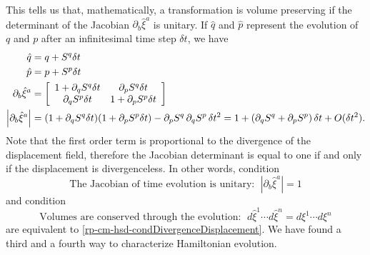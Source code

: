 This tells us that, mathematically, a transformation is volume preserving if the determinant of the Jacobian $\partial_b \hat{\xi}^a$ is unitary. If $\hat{q}$ and $\hat{p}$ represent the evolution of $q$ and $p$ after an infinitesimal time step $\delta t$, we have
\begin{equation}
	\begin{aligned}
	\hat{q} &= q + S^q \delta t \\ 
	\hat{p} &= p + S^p \delta t \\ 
	\partial_b \hat{\xi}^a &= \left[\begin{array}{ c c }
		1 + \partial_q S^q \delta t & \partial_p S^q \delta t \\
		\partial_q S^p \delta t & 1 + \partial_p S^p \delta t \\
	\end{array} \right] \\
	\left|\partial_b \hat{\xi}^a\right| &= (1 + \partial_q S^q \delta t) (1 + \partial_p S^p \delta t) - \partial_p S^q \, \partial_q S^p \, \delta t^2  = 1 + \left(\partial_q S^q + \partial_p S^p \right) \delta t + O(\delta t^2). 
	\end{aligned}
\end{equation}
Note that the first order term is proportional to the divergence of the displacement field, therefore the Jacobian determinant is equal to one if and only if the displacement is divergenceless. In other words, condition
\begin{equation}\label{rp-cm-hsd-condUnitaryJacobian}
	\tag{HM-3}
	\text{The Jacobian of time evolution is unitary: } \; \left|\partial_b \hat{\xi}^a\right|=1
\end{equation}
and condition
\begin{equation}\label{rp-cm-hsd-condConservedVolume}
	\tag{HM-4}
	\text{Volumes are conserved through the evolution: } \; d\hat{\xi}^1 \cdots d\hat{\xi}^n = d\xi^1 \cdots d\xi^n
\end{equation}
are equivalent to \ref{rp-cm-hsd-condDivergenceDisplacement}. We have found a third and a fourth way to characterize Hamiltonian evolution.

